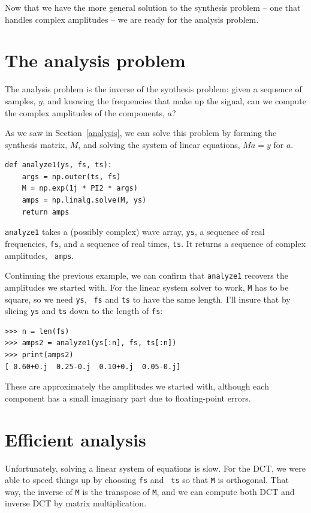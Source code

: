 \documentclass[12pt]{book}
\begin{document}
Now that we have the more general solution to the synthesis problem --
one that handles complex amplitudes -- we are ready for the analysis
problem.


\section{The analysis problem}

The analysis problem is the inverse of the synthesis problem: given a
sequence of samples, $y$, and knowing the frequencies
that make up the signal, can we compute the complex amplitudes of the
components, $a$?

As we saw in Section~\ref{analysis}, we can solve this problem by forming
the synthesis matrix, $M$, and solving the system of linear
equations, $M a = y$ for $a$.

\begin{verbatim}
def analyze1(ys, fs, ts):
    args = np.outer(ts, fs)
    M = np.exp(1j * PI2 * args)
    amps = np.linalg.solve(M, ys)
    return amps
\end{verbatim}

{\tt analyze1} takes a (possibly complex) wave array, {\tt ys}, a
sequence of real frequencies, {\tt fs}, and a sequence of real
times, {\tt ts}.  It returns a sequence of complex amplitudes, {\tt
  amps}.

Continuing the previous example, we can confirm that {\tt analyze1}
recovers the amplitudes we started with.  For the linear system
solver to work, {\tt M} has to be square, so we need {\tt ys}, {\tt
  fs} and {\tt ts} to have the same length.  I'll insure that by
slicing {\tt ys} and {\tt ts} down to the length of {\tt fs}:

\begin{verbatim}
>>> n = len(fs)
>>> amps2 = analyze1(ys[:n], fs, ts[:n])
>>> print(amps2)
[ 0.60+0.j  0.25-0.j  0.10+0.j  0.05-0.j]
\end{verbatim}

These are approximately the amplitudes we started with, although
each component has a small imaginary part due to
floating-point errors.


\section{Efficient analysis}

Unfortunately, solving a linear system of equations is slow.  For the
DCT, we were able to speed things up by choosing {\tt fs} and {\tt
  ts} so that {\tt M} is orthogonal.  That way, the inverse of {\tt M}
is the transpose of {\tt M}, and we can compute both DCT and inverse
DCT by matrix multiplication.
\end{document}
